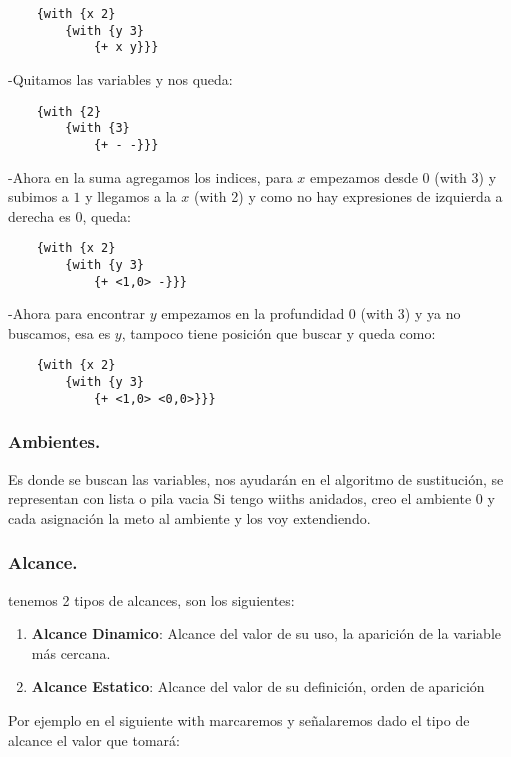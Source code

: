 \documentclass[12pt]{article}
\begin{document}
\begin{lstlisting}
    {with {x 2}
        {with {y 3}
            {+ x y}}}
\end{lstlisting}

-Quitamos las variables y nos queda:

\begin{lstlisting}
    {with {2}
        {with {3}
            {+ - -}}}
\end{lstlisting}
-Ahora en la suma agregamos los indices, para $x$ empezamos desde $0$ (with 3) y subimos a $1$ y llegamos a la $x$ (with 2) y como no hay expresiones de izquierda a derecha es $0$, queda:
\begin{lstlisting}
    {with {x 2}
        {with {y 3}
            {+ <1,0> -}}}
\end{lstlisting}
-Ahora para encontrar $y$ empezamos en la profundidad $0$ (with 3) y ya no buscamos, esa es $y$, tampoco tiene posición que buscar y queda como:
\begin{lstlisting}
    {with {x 2}
        {with {y 3}
            {+ <1,0> <0,0>}}}
\end{lstlisting}
{\color{blue} \subsubsection*{Ambientes.}}
\vspace{-0.5em}
Es donde se buscan las variables, nos ayudarán en el algoritmo de sustitución, se representan con lista o pila vacia
Si tengo wiiths anidados, creo el ambiente 0 y cada asignación la meto al ambiente y los voy extendiendo.\\

{\color{blue} \subsubsection*{Alcance.}}
\vspace{-0.5em}
tenemos 2 tipos de alcances, son los siguientes:

\begin{enumerate}
    \item \textbf{Alcance Dinamico}: Alcance del valor de su uso, la aparición de la variable más cercana.
    \item \textbf{Alcance Estatico}: Alcance del valor de su definición, orden de aparición
\end{enumerate}
Por ejemplo en el siguiente with marcaremos y señalaremos dado el tipo de alcance el valor que tomará:\\
\end{document}
